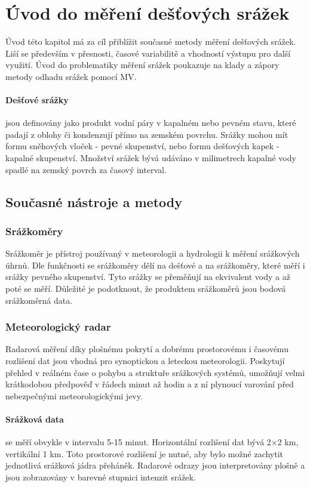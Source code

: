 \documentclass[a4paper,12pt,oneside]{report}
\begin{document}
\section{Úvod do měření dešťových srážek}
Úvod této kapitol má za cíl přiblížit současné metody měření dešťových srážek. Liší se především v přesnosti, časové variabilitě a vhodností výstupu pro další využití. Úvod do problematiky měření srážek poukazuje na klady a zápory metody odhadu srážek pomocí MV.


\paragraph*{Dešťové srážky}jsou definovány jako produkt vodní páry v kapalném nebo pevném stavu, které padají z oblohy či kondenzují přímo na zemském povrchu. Srážky mohou mít formu sněhových vloček - pevné skupenství, nebo formu dešťových kapek - kapalné skupenství. Množství srážek bývá udáváno v milimetrech kapalné vody spadlé na zemský povrch za časový interval.\cite{wmo} 

\subsection{Současné nástroje a metody }
\label{subsec:11}

\subsubsection{Srážkoměry}
Srážkoměr je přístroj používaný v meteorologii a hydrologii k měření srážkových úhrnů. Dle funkčnosti se srážkoměry dělí na dešťové a na srážkoměry, které měří i srážky pevného skupenství. Tyto srážky se přeměňují na ekvivalent vody a až poté se měří. Důležité je podotknout, že produktem srážkoměrů jsou bodová srážkoměrná data.

\subsubsection{Meteorologický radar}
Radarová měření díky plošnému pokrytí a dobrému prostorovému i časovému rozlišení dat jsou vhodná pro synoptickou a leteckou meteorologii. Poskytují přehled v reálném čase o pohybu a struktuře srážkových systémů, umožňují velmi krátkodobou předpověď v řádech minut až hodin a z ní plynoucí varování před nebezpečnými meteorologickými jevy.\cite{radar_chmu}

\paragraph*{Srážková data} se měří obvykle v intervalu 5-15 minut. Horizontální rozlišení dat bývá 2×2 km, vertikální 1 km. Toto prostorové rozlišení je nutné, aby bylo možné zachytit jednotlivá srážková jádra přeháněk. Radarové odrazy jsou interpretovány plošně a jsou zobrazovány v barevné stupnici intenzit srážek.
\end{document}
